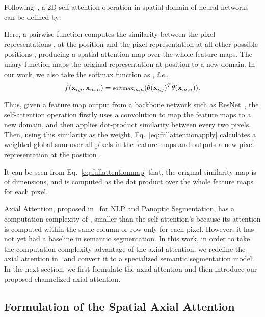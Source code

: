 \documentclass[journal]{IEEEtran}
\begin{document}
Following~\cite{cNonLocal, cStandAloneSelfAttention}, a 2D self-attention operation in spatial domain of neural networks can be defined by:

Here, a pairwise function  computes the similarity between the pixel representations , at the position  and the pixel representation  at all other possible positions , producing a spatial attention map over the whole feature maps. 
The unary function  maps the original representation at position  to a new domain. In our work, we also take the softmax function as , \textit{i.e.},
\begin {equation}
\footnotesize
f( \mathbf{x}_{i,j}, \mathbf{x}_{m,n}) = \text{softmax}_{m,n}(\theta( \mathbf{x}_{i,j})^T \theta( \mathbf{x}_{m,n})).
\label{eq:fullattentionmap}
\end {equation}

Thus, given a feature map output from a backbone network such as ResNet~\cite{cResnet}, the self-attention operation firstly uses a  convolution  to map the feature maps  to a new domain, and then applies dot-product similarity \cite{cNonLocal} between every two pixels.
Then, using this similarity as the weight, Eq.~\eqref{eq:fullattentionapply} calculates a weighted global sum over all pixels in the feature maps and outputs a new pixel representation  at the position . 

It can be seen from
Eq.~\eqref{eq:fullattentionmap} that, the original 
similarity map is of  dimensions, 
and is computed as the dot product over the whole feature maps for each pixel. 

Axial Attention, proposed in~\cite{cAxialAttention, cAxialDeepLab} for NLP and Panoptic Segmentation, has a computation complexity of , smaller than the self attention's  because its attention is computed within the same column or row only for each pixel. 
However, it has not yet had a baseline in semantic segmentation. 
In this work, in order to take the computation complexity advantage of the axial attention, we redefine the axial attention in~\cite{cAxialAttention, cAxialDeepLab} and convert it to a specialized semantic segmentation model.
In the next section, we first formulate the axial attention and then introduce our proposed channelized axial attention.

\subsection {Formulation of the Spatial Axial Attention}
\label{sGetAttentionMap}
\end{document}
